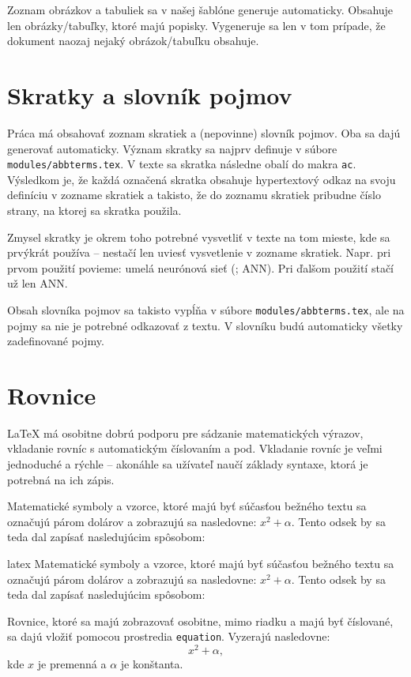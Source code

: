 Zoznam obrázkov a tabuliek sa v našej šablóne generuje automaticky. Obsahuje len obrázky/tabuľky, ktoré majú popisky. Vygeneruje sa len v tom prípade, že dokument naozaj nejaký obrázok/tabuľku obsahuje.

\section{Skratky a slovník pojmov}
\label{sec:skratky}

Práca má obsahovať zoznam skratiek a (nepovinne) slovník pojmov. Oba sa dajú generovať automaticky. Význam skratky sa najprv definuje v súbore \texttt{modules/abbterms.tex}. V texte sa skratka následne obalí do makra \texttt{ac}. Výsledkom je, že každá označená skratka obsahuje hypertextový odkaz na svoju definíciu v zozname skratiek a takisto, že do zoznamu skratiek pribudne číslo strany, na ktorej sa skratka použila.

Zmysel skratky je okrem toho potrebné vysvetliť v texte na tom mieste, kde sa prvýkrát používa -- nestačí len uviesť vysvetlenie v zozname skratiek. Napr. pri prvom použití povieme: umelá neurónová sieť (; \ac{ANN}). Pri ďalšom použití stačí už len \ac{ANN}.

Obsah slovníka pojmov sa takisto vypĺňa v súbore \texttt{modules/abbterms.tex}, ale na pojmy sa nie je potrebné odkazovať z textu. V slovníku budú automaticky všetky zadefinované pojmy.

\section{Rovnice}

LaTeX má osobitne dobrú podporu pre sádzanie matematických výrazov, vkladanie rovníc s automatickým číslovaním a pod. Vkladanie rovníc je veľmi jednoduché a rýchle -- akonáhle sa užívateľ naučí základy syntaxe, ktorá je potrebná na ich zápis.

Matematické symboly a vzorce, ktoré majú byť súčasťou bežného textu sa označujú párom dolárov a zobrazujú sa nasledovne: $x^2 + \alpha$. Tento odsek by sa teda dal zapísať nasledujúcim spôsobom:
\begin{inlinecode}{latex}
Matematické symboly a vzorce, ktoré majú byť súčasťou bežného
textu sa označujú párom dolárov a zobrazujú sa nasledovne: $x^2 + \alpha$.
Tento odsek by sa teda dal zapísať nasledujúcim spôsobom:
\end{inlinecode}

Rovnice, ktoré sa majú zobrazovať osobitne, mimo riadku a majú byť číslované, sa dajú vložiť pomocou prostredia \texttt{equation}. Vyzerajú nasledovne:
\begin{equation}
x^2 + \alpha,
\end{equation}
kde $x$ je premenná a $\alpha$ je konštanta.

